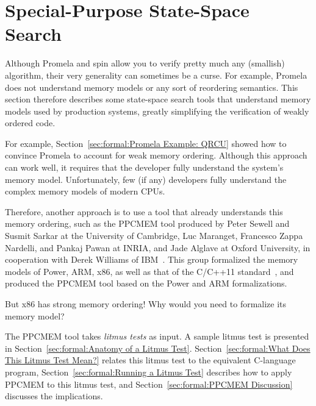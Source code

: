 
\section{Special-Purpose State-Space Search}
\label{sec:formal:Special-Purpose State-Space Search}

Although Promela and spin allow you to verify pretty much any (smallish)
algorithm, their very generality can sometimes be a curse.
For example, Promela does not understand memory models or any sort
of reordering semantics.
This section therefore describes some state-space search tools that
understand memory models used by production systems, greatly simplifying the
verification of weakly ordered code.

For example,
Section~\ref{sec:formal:Promela Example: QRCU}
showed how to convince Promela to account for weak memory ordering.
Although this approach can work well, it requires that the developer
fully understand the system's memory model.
Unfortunately, few (if any) developers fully understand the complex
memory models of modern CPUs.

Therefore, another approach is to use a tool that already understands
this memory ordering, such as the PPCMEM tool produced by
Peter Sewell and Susmit Sarkar at the University of Cambridge, Luc
Maranget, Francesco Zappa Nardelli, and Pankaj Pawan at INRIA, and Jade
Alglave at Oxford University, in cooperation with Derek Williams of
IBM~\cite{JadeAlglave2011ppcmem}.
This group formalized the memory models of Power, ARM, x86, as well
as that of the C/C++11 standard~\cite{PeteBecker2011N3242}, and
produced the PPCMEM tool based on the Power and ARM formalizations.

\QuickQuiz{}
	But x86 has strong memory ordering!  Why would you need to
	formalize its memory model?
 \QuickQuizEnd

The PPCMEM tool takes \emph{litmus tests} as input.
A sample litmus test is presented in
Section~\ref{sec:formal:Anatomy of a Litmus Test}.
Section~\ref{sec:formal:What Does This Litmus Test Mean?}
relates this litmus test to the equivalent C-language program,
Section~\ref{sec:formal:Running a Litmus Test} describes how to
apply PPCMEM to this litmus test, and
Section~\ref{sec:formal:PPCMEM Discussion}
discusses the implications.


